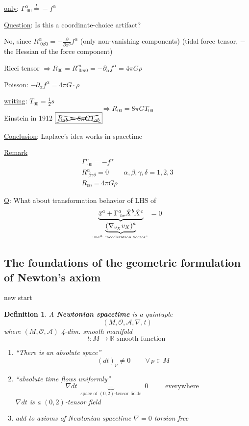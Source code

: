 \documentclass[10pt, twoside]{amsart}
\newtheorem{definition}{Definition}
\begin{document}
\begin{multicols*}{2}
\underline{only}: $\boxed{ \Gamma^{\alpha}_{ \, \, 00} \overset{!}{=} -f^{\alpha}}$

\underline{Question}: Is this a coordinate-choice artifact?

No, since $R^{\alpha}_{ \, \, 0\beta 0} = - \frac{ \partial }{ \partial x^{\beta}} f^{\alpha}$ (only non-vanishing components) (tidal force tensor, $-$ the Hessian of the force component)

Ricci tensor $\Longrightarrow  R_{00} = R^m_{ \, \, 0m0} = -\partial_{\alpha} f^{\alpha} = 4\pi G \rho$
 
Poisson: $-\partial_{\alpha}f^{\alpha} = 4\pi G\cdot \rho$

\underline{writing}: $T_{00} = \frac{1}{2}s$ 
\[
\Longrightarrow \boxed{ R_{00} = 8 \pi G T_{00} }
\]
Einstein in 1912 $ \boxed{ \xcancel{ R_{ab} = 8\pi G T_{ab} }}$


\underline{Conclusion}: Laplace's idea works in spacetime

\underline{Remark} 
\[
\begin{gathered}
  \Gamma^{\alpha}_{ \, \, 00 } = -f^{\alpha} \\ 
  R^{\alpha}_{ \, \, \beta \gamma \delta } = 0 \quad \quad \, \alpha, \beta , \gamma, \delta = 1,2,3 \\
  \boxed{ R_{00} = 4\pi G \rho }
\end{gathered}
\]

\underline{Q}: What about transformation behavior of LHS of 
\[
\underbrace{ \ddot{x}^a + \Gamma^a_{ \, \, bc } \dot{X}^b \dot{X}^c}_{ \underbrace{ (\nabla_{v_X}v_X)^a}_{ := a^a \text{ ``acceleration \underline{vector}'' } } } = 0
\]

\subsection{The foundations of the geometric formulation of Newton's axiom}

new start
\begin{definition}
A \textbf{Newtonian spacetime} is a quintuple \[
(M , \mathcal{O}, \mathcal{A}, \nabla , t)
\]
where $(M,\mathcal{O}, \mathcal{A})$ 4-dim. smooth manifold
\[
t: M \to \mathbb{R} \text{ smooth function }
\]

\begin{enumerate}
  \item[(i)] ``There is an absolute space''
\[
(dt)_p \neq 0 \quad \quad \, \forall \, p \in M 
\]
    \item[(ii)] ``absolute time flows uniformly''
\[
\nabla dt \underbrace{=}_{ \text{ space of $(0,2)$-tensor fields } }  0 \quad \quad \, \text{ everywhere }
\]
$\nabla dt $ is a $(0,2)$-tensor field
\item[(iii)] add to axioms of Newtonian spacetime 
$\nabla = 0$ torsion free
\end{enumerate}
\end{definition}


\end{multicols*}
\end{document}

